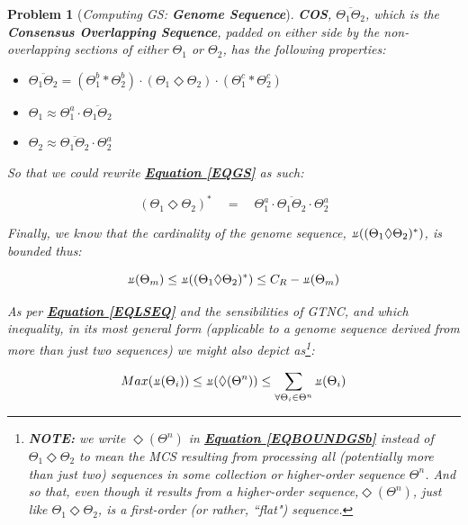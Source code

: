 \documentclass[a4paper, 18pt]{article} %
\newtheorem{prob}{Problem}
\newcommand{\invpi}{\rotatebox[origin=c]{180}{$\pi$}}
\begin{document}
\begin{prob}[\textit{Computing GS: \textbf{Genome Sequence}}]
\textbf{COS}, $\overline{\Theta_1\Theta_2}$, which is the \textbf{Consensus Overlapping Sequence}, padded on either side by the non-overlapping sections of either $\Theta_1$ or $\Theta_2$, has the following properties:

\begin{itemize}
\item $\overline{\Theta_1\Theta_2} = (\Theta_1^b \ast \Theta_2^b)\cdot(\Theta_1 \Diamond \Theta_2)\cdot(\Theta_1^c \ast \Theta_2^c)$
\item $\Theta_1 \approx \Theta_1^a \cdot \overline{\Theta_1\Theta_2}$
\item $\Theta_2 \approx \overline{\Theta_1\Theta_2} \cdot \Theta_2^a$
\end{itemize}

So that we could rewrite \textbf{\hyperref[EQGS]{Equation \ref{EQGS}}} as such:

\vspace{1em}
\begin{equation}
\label{EQGS2}
(\Theta_1 \Diamond \Theta_2)^* \quad = \quad \Theta_1^a\cdot\overline{\Theta_1\Theta_2}\cdot\Theta_2^a
\end{equation}
\vspace{1em}

Finally, we know that the cardinality of the genome sequence, $\invpi((\Theta_1 \Diamond \Theta_2)^*)$, is bounded thus:

\vspace{1em}
\begin{equation}
\label{EQBOUNDGSa}
\invpi(\Theta_m) \leq \invpi((\Theta_1 \Diamond \Theta_2)^*) \leq C_R - \invpi(\Theta_m)
\end{equation}
\vspace{1em}

As per \textbf{\hyperref[EQLSEQ]{Equation  \ref{EQLSEQ}}} and the sensibilities of GTNC\cite{Lutalo2024gtnc}, and which inequality, in its most general form (applicable to a genome sequence derived from more than just two sequences) we might also depict as\footnote{\textbf{NOTE:} we write $\Diamond(\Theta^n)$ in  \textbf{\hyperref[EQBOUNDGSb]{Equation  \ref{EQBOUNDGSb}}} instead of $\Theta_1 \Diamond \Theta_2$ to mean the MCS resulting from processing all (potentially more than just two) sequences in some collection or higher-order sequence $\Theta^n$. And so that, even though it results from a higher-order sequence,$\Diamond(\Theta^n)$, just like $\Theta_1 \Diamond \Theta_2$, is a first-order (or rather, ``flat") sequence.}:


\vspace{1em}
\begin{equation}
\label{EQBOUNDGSb}
Max(\invpi(\Theta_i)) \leq \invpi(\Diamond(\Theta^n)) \leq \sum\limits_{\forall \Theta_i \in \Theta^n} \invpi(\Theta_i)
\end{equation}
\vspace{1em}


\end{prob}
\end{document}
